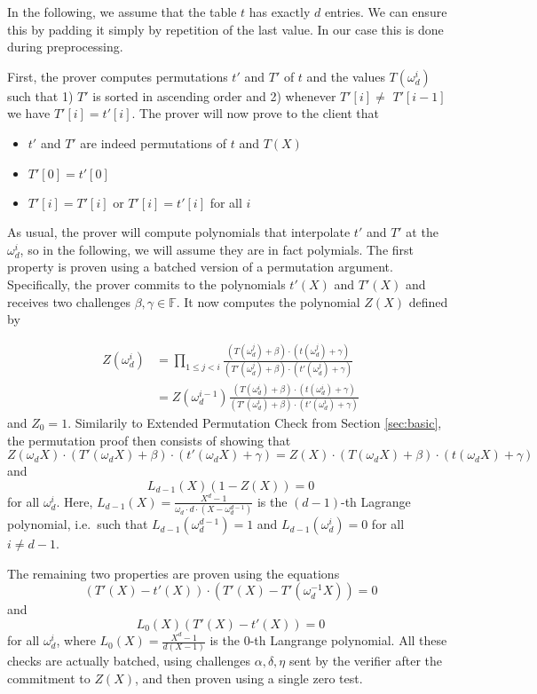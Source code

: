 \documentclass[final]{zamarep}
\newcommand{\field}{\mathbb{F}}
\begin{document}
In the following, we assume that the table $t$ has exactly $d$ entries. We can ensure this by padding it simply by repetition of the last value. In our case this is done during preprocessing.

First, the prover computes permutations $t'$ and $T'$ of $t$ and the values $T(\omega_d^i)$ such that 1) $T'$ is sorted in ascending order and 2) whenever $T'[i] \neq $ $T'[i-1]$ we have $T'[i] = t'[i]$. The prover will now prove to the client that
\begin{itemize}
\item $t'$ and $T'$ are indeed permutations of $t$ and $T(X)$
\item $T'[0] = t'[0]$
\item $T'[i] = T'[i]$ or $T'[i] = t'[i]$ for all $i$
\end{itemize}
As usual, the prover will compute polynomials that interpolate $t'$ and $T'$ at the $\omega_d^i$, so in the following, we will assume they are in fact polymials. 
The first property is proven using a batched version of a permutation argument. Specifically, the prover commits to the polynomials $t'(X)$ and $T'(X)$ and receives two challenges $\beta, \gamma \in \field$. It now computes the polynomial $Z(X)$ defined by

\begin{align*}
  Z(\omega_d^{i})
  &= \prod_{1 \leq j < i} \frac{(T(\omega_d^j) + \beta) \cdot (t(\omega_d^j) + \gamma)}{(T'(\omega_d^j) + \beta) \cdot (t'(\omega_d^j) + \gamma)}\\
  &= Z(\omega_d^{i - 1}) \frac{(T(\omega_d^i) + \beta) \cdot (t(\omega_d^i) + \gamma)}{(T'(\omega_d^i) + \beta) \cdot (t'(\omega_d^i) + \gamma)}
\end{align*}
and $Z_0 = 1$. 
Similarily to Extended Permutation Check from Section \ref{sec:basic}, the permutation proof then consists of showing that
\[
  Z(\omega_d X) \cdot (T'(\omega_d X) + \beta) \cdot (t'(\omega_d X) + \gamma) = Z(X) \cdot (T(\omega_d X) + \beta) \cdot (t(\omega_d X) + \gamma)
\]
and
\[
  L_{d-1}(X) (1 - Z(X)) = 0
\]
for all $\omega_d^i$. Here, $L_{d-1}(X) = \frac{X^d - 1}{\omega_d \cdot d \cdot (X - \omega_d^{d-1})}$ is the $(d-1)$-th Lagrange polynomial, i.e.\ such that $L_{d-1}(\omega_d^{d-1}) = 1$ and $L_{d-1}(\omega_d^{i}) = 0$ for all $i \neq d - 1$.  

The remaining two properties are proven using the equations
\[
  (T'(X) - t'(X)) \cdot (T'(X) - T'(\omega_d^{-1}X)) = 0
\]
and
\[
  L_0(X)(T'(X) - t'(X)) = 0
\]
for all $\omega_d^i$, where $L_0(X) = \frac{X^d - 1}{d (X - 1)}$ is the $0$-th Langrange polynomial. All these checks are actually batched, using challenges $\alpha, \delta, \eta$ sent by the verifier after the commitment to $Z(X)$, and then proven using a single zero test. 
\end{document}
